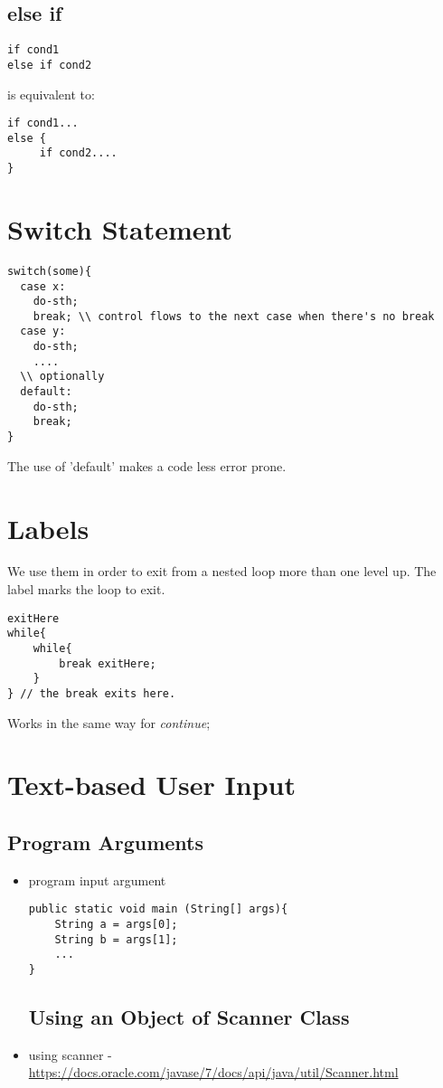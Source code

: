 \documentclass{report}
\begin{document}
\section{else if}
\begin{verbatim}
if cond1
else if cond2
\end{verbatim}
is equivalent to:
\begin{verbatim}
if cond1...
else {
     if cond2....
}
\end{verbatim}



\chapter{Switch Statement}
\begin{verbatim}
switch(some){
  case x:
    do-sth;
    break; \\ control flows to the next case when there's no break 
  case y:
    do-sth;
    ....
  \\ optionally
  default:
    do-sth;
    break;
}
\end{verbatim}
The use of 'default' makes a code less error prone.

\chapter{Labels}
We use them in order to exit from a nested loop more than one level up. The label marks the loop to exit.
\begin{verbatim}
exitHere
while{
	while{
		break exitHere;
	}
} // the break exits here.
\end{verbatim}
Works in the same way for \textit{continue};
 
\chapter{Text-based User Input}
\section{Program Arguments}
\begin{itemize}
\item program input argument
\begin{verbatim}
public static void main (String[] args){
	String a = args[0];
    String b = args[1];
    ...
}
\end{verbatim}

\section{Using an Object of Scanner Class}
\item using scanner - \url{https://docs.oracle.com/javase/7/docs/api/java/util/Scanner.html}
\end{itemize}
\end{document}
